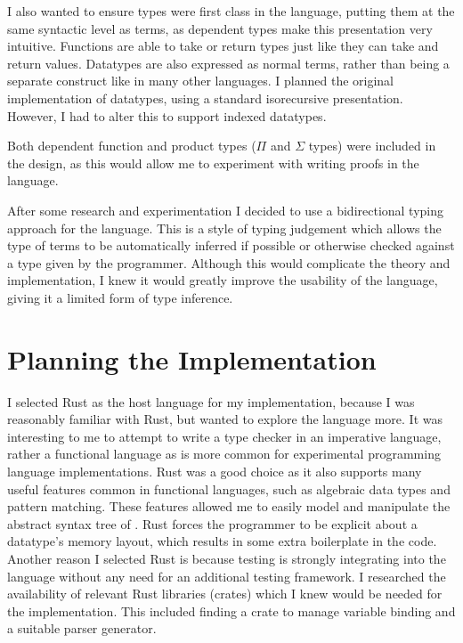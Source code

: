 \documentclass[12pt,a4paper,twoside]{report}
\begin{document}
I also wanted to ensure types were first class in the language, putting them at the same syntactic level as terms, as dependent types make this presentation very intuitive.
Functions are able to take or return types just like they can take and return values.
Datatypes are also expressed as normal terms, rather than being a separate construct like in many other languages.
I planned the original implementation of datatypes, using a standard isorecursive presentation.
However, I had to alter this to support indexed datatypes.

Both dependent function and product types (\(\Pi\) and \(\Sigma\) types) were included in the design, as this would allow me to experiment with writing proofs in the language.

After some research and experimentation I decided to use a bidirectional typing approach \cite{pierce98} for the language.
This is a style of typing judgement which allows the type of terms to be automatically inferred if possible or otherwise checked against a type given by the programmer.
Although this would complicate the theory and implementation, I knew it would greatly improve the usability of the language, giving it a limited form of type inference.

\section{Planning the Implementation}

I selected Rust as the host language for my implementation, because I was reasonably familiar with Rust, but wanted to explore the language more.
It was interesting to me to attempt to write a type checker in an imperative language, rather a functional language as is more common for experimental programming language implementations.
Rust was a good choice as it also supports many useful features common in functional languages, such as algebraic data types and pattern matching.
These features allowed me to easily model and manipulate the abstract syntax tree of \pimu{}.
Rust forces the programmer to be explicit about a datatype's memory layout, which results in some extra boilerplate in the code.
Another reason I selected Rust is because testing is strongly integrating into the language without any need for an additional testing framework.
I researched the availability of relevant Rust libraries (crates) which I knew would be needed for the implementation.
This included finding a crate to manage variable binding and a suitable parser generator.
\end{document}
